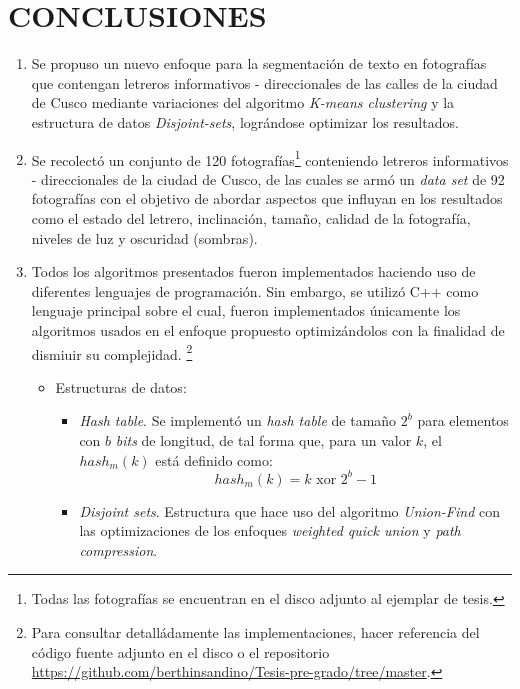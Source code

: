 \chapter*{CONCLUSIONES}
\label{cap:conclusiones}
\begin{enumerate}
	\item Se propuso un nuevo enfoque para la segmentación de texto en fotografías
	que contengan letreros informativos - direccionales de las calles de la ciudad
de Cusco mediante variaciones del algoritmo \textit{K-means clustering} y la
estructura de datos \textit{Disjoint-sets}, lográndose optimizar los resultados.
	\item Se recolectó un conjunto de 120 fotografías\footnote{Todas las 
	fotografías se encuentran en el disco adjunto al ejemplar de tesis.}
conteniendo letreros informativos - direccionales de la ciudad de Cusco, de las
cuales se armó un \textit{data set} de 92 fotografías con el objetivo de abordar
aspectos que influyan en los resultados como el estado del letrero, inclinación,
tamaño, calidad de la fotografía, niveles de luz y oscuridad (sombras).
	\item Todos los algoritmos presentados fueron implementados haciendo uso de 
	diferentes lenguajes de programación. Sin embargo, se utilizó C++ como
lenguaje principal sobre el cual, fueron implementados únicamente los algoritmos
usados en el enfoque propuesto optimizándolos con la finalidad de dismiuir su
complejidad. \footnote{Para consultar detalládamente las implementaciones, hacer
referencia del código fuente adjunto en el disco o el repositorio
\url{https://github.com/berthinsandino/Tesis-pre-grado/tree/master}.}
		\begin{itemize}
			\item Estructuras de datos:
			\begin{itemize}
				\item \textit{Hash table}. Se implementó un \textit{hash table} de 
				tamaño $2^b$ para elementos con $b$ \textit{bits} de longitud, de tal
				forma que, para un valor $k$, el $hash_m(k)$ está definido como:
				\begin{equation}
					hash_m(k) = k \text{ xor } 2^b - 1
				\end{equation}
				\item \textit{Disjoint sets}. Estructura que hace uso del algoritmo 
				\textit{Union-Find} con las optimizaciones de los enfoques
				\textit{weighted quick union} y \textit{path compression}.
			\end{itemize}

\end{itemize}
\end{enumerate}
